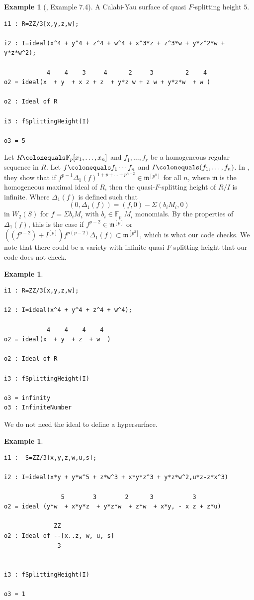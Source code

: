 \documentclass{article}
\theoremstyle{plain}
\theoremstyle{definition}
\newtheorem{example}[theorem]{Example}
\newcommand{\F}{\mathbb{F}}
\newcommand{\coloneqq}{\colonequals}
\begin{document}
\begin{example} [\cite{KawakamiTakamatsuYoshikawaFedderQuasi}, Example 7.4] A Calabi-Yau surface of quasi $F$-splitting height $5$.
\begin{verbatim}
i1 : R=ZZ/3[x,y,z,w];

i2 : I=ideal(x^4 + y^4 + z^4 + w^4 + x^3*z + z^3*w + y*z^2*w + y*z*w^2);

            4    4    3     4      2     3         2    4
o2 = ideal(x  + y  + x z + z  + y*z w + z w + y*z*w  + w )

o2 : Ideal of R

i3 : fSplittingHeight(I)

o3 = 5
\end{verbatim}

\end{example}

Let $R\coloneqq \F_p[x_1,\ldots,x_n]$ and $f_1,\ldots,f_r$ be a homogeneous regular sequence in $R$. Let $f\coloneqq f_1\cdots f_n$ and $I\coloneqq(f_1,\ldots,f_n)$. In \cite[Theorem 5.8]{KawakamiTakamatsuYoshikawaFedderQuasi}, they show that if $f^{p-1} \Delta_1(f)^{1+p+\ldots+p^{n-2}}\in \mathfrak{m}^{[p^n]}$ for all $n$, where $\mathfrak{m}$ is the homogeneous maximal ideal of $R$, then the quasi-$F$-splitting height of $R/I$ is infinite. Where $\Delta_1(f)$ is defined such that 
\[
(0,\Delta_1(f))=(f,0)-\Sigma(b_i M_i,0)
\]
in $W_2(S)$ for $f=\Sigma b_i M_i$ with $b_i\in \F_p$ $M_i$ monomials.
By the properties of $\Delta_1(f)$, this is the case if $f^{p-2}\in \mathfrak{m}^{[p]}$ or 
$((f^{p-2})+I^{[p]})f^{p(p-2)}\Delta_1(f) \subset \mathfrak{m}^{[p^2]}$, which is what our code checks. 
We note that there could be a variety with infinite quasi-$F$-splitting height that our code does not check. 

\begin{example} 
\begin{verbatim}
i1 : R=ZZ/3[x,y,z,w];

i2 : I=ideal(x^4 + y^4 + z^4 + w^4);

            4    4    4    4
o2 = ideal(x  + y  + z  + w  )

o2 : Ideal of R

i3 : fSplittingHeight(I)

o3 = infinity
o3 : InfiniteNumber
\end{verbatim}
\end{example}

We do not need the ideal to define a hypersurface. 

\begin{example}
\begin{verbatim}
i1 :  S=ZZ/3[x,y,z,w,u,s];

i2 : I=ideal(x*y + y*w^5 + z*w^3 + x*y*z^3 + y*z*w^2,u*z-z*x^3)

                5        3        2      3           3
o2 = ideal (y*w  + x*y*z  + y*z*w  + z*w  + x*y, - x z + z*u)

              ZZ
o2 : Ideal of --[x..z, w, u, s]
               3


i3 : fSplittingHeight(I)

o3 = 1
\end{verbatim}
\end{example}

\printbibliography

%
%
\end{document}
